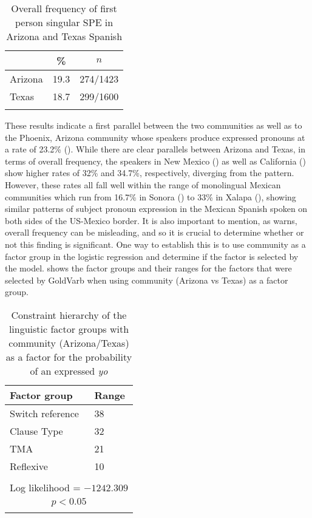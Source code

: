 \documentclass[output=paper]{langscibook}
\begin{document}
\begin{table}
\caption{Overall frequency of first person singular SPE in Arizona and Texas Spanish\label{tab:aztx:2}}
\begin{tabular}{lcc}
	\lsptoprule
	        & {\%} & {$n$}\\\midrule
	Arizona & 19.3 & 274/1423\\
	Texas   & 18.7 & 299/1600\\
	\lspbottomrule
\end{tabular}
\end{table}

These results indicate a first parallel between the two communities as well as to the Phoenix, Arizona community whose speakers produce expressed pronouns at a rate of 23.2\% (\citealt{Cerrón-Palomino2016}). While there are clear parallels between Arizona and Texas, in terms of overall frequency, the speakers in New Mexico (\citealt{TorresCacoullosTravis2010b}) as well as California (\citealt{Silva-Corvalán1994}) show higher rates of 32\% and 34.7\%, respectively, diverging from the pattern. However, these rates all fall well within the range of monolingual Mexican communities which run from 16.7\% in Sonora (\citealt{Bessett2018}) to 33\% in Xalapa (\citealt{Orozco2016}), showing similar patterns of subject pronoun expression in the Mexican Spanish spoken on both sides of the US-Mexico border. It is also important to mention, as \citet{Travis2007} warns, overall frequency can be misleading, and so it is crucial to determine whether or not this finding is significant. One way to establish this is to use community as a factor group in the logistic regression and determine if the factor is selected by the model.  shows the factor groups and their ranges for the factors that were selected by GoldVarb when using community (Arizona vs Texas) as a factor group.

\begin{table}
\caption{Constraint hierarchy of the linguistic factor groups with community (Arizona/Texas) as a factor for the probability of an expressed \textit{yo}\label{tab:aztx:3}}
\begin{tabular}{ll}
	\lsptoprule
	{Factor group} & {Range}\\\midrule
	{Switch reference} & {38}\\
	{Clause Type} & {32}\\
	{TMA} &  {21}\\
	{Reflexive} & {10}\\
	& \\
	\multicolumn{2}{c}{{Log likelihood = $-1242.309$}}\\
	\multicolumn{2}{c}{{$p < 0.05$}}\\
	\lspbottomrule
\end{tabular}
\end{table}
\end{document}
